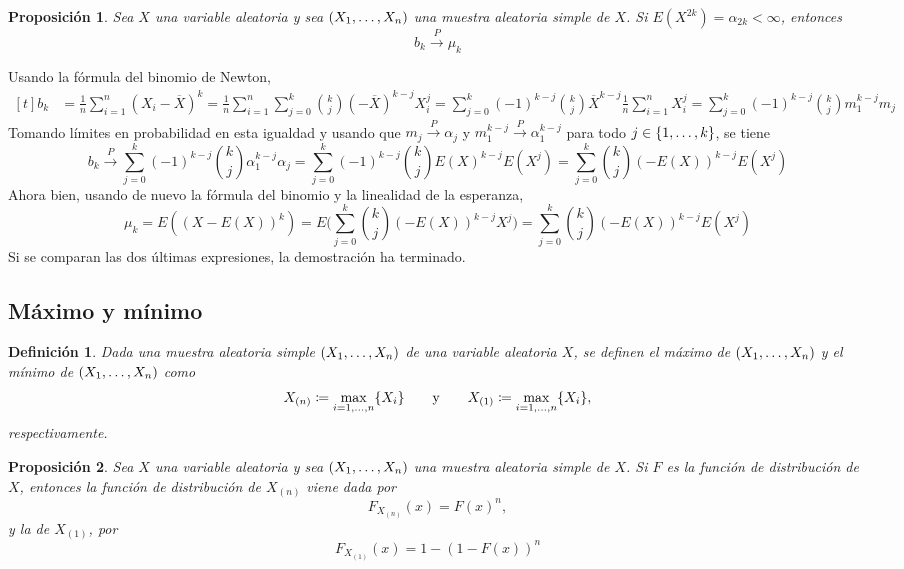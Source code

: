 \documentclass[11pt]{report}
\makeatletter
\renewenvironment{proof}[1][\proofname]{\par
  \pushQED{\qed}%
  \normalfont \topsep\z@skip %
  \trivlist
  \item[\hskip\labelsep
        \itshape
    #1\@addpunct{.}]\ignorespaces
}{%
  \popQED\endtrivlist\@endpefalse
}
\newtheorem{proposition}{Proposición}
\newtheorem{definition}{Definición}
\theoremstyle{definition}
\makeatother
\begin{document}
\begin{proposition}
Sea $X$ una variable aleatoria y sea $(X_1,\mathellipsis,X_n)$ una muestra aleatoria simple de $X$. Si $E(X^{2k}) = \alpha_{2k} < \infty$, entonces \[b_k \xrightarrow{P} \mu_k\]
\end{proposition}

\begin{proof}
Usando la fórmula del binomio de Newton,
\[
\begin{aligned}[t]
b_k &= \frac{1}{n}\sum_{i=1}^n(X_i-\overline{X})^k = \frac{1}{n}\sum_{i=1}^n\sum_{j=0}^k\binom{k}{j}(-\overline{X})^{k-j}X_i^j = \sum_{j=0}^k(-1)^{k-j} \binom{k}{j} \overline{X}^{k-j} \frac{1}{n}\sum_{i=1}^n X_i^j = \sum_{j=0}^k (-1)^{k-j}\binom{k}{j} m_1^{k-j} m_j
\end{aligned}
\]
Tomando límites en probabilidad en esta igualdad y usando que $m_j \xrightarrow{P}\alpha_j$ y $m_1^{k-j} \xrightarrow{P} \alpha_1^{k-j}$ para todo $j \in \{1,\mathellipsis,k\}$, se tiene
\[b_k \xrightarrow{P} \sum_{j=0}^k (-1)^{k-j} \binom{k}{j} \alpha_1^{k-j}\alpha_j = \sum_{j=0}^k (-1)^{k-j} \binom{k}{j} E(X)^{k-j}E(X^j) = \sum_{j=0}^k \binom{k}{j} (-E(X))^{k-j}E(X^j)\]
Ahora bien, usando de nuevo la fórmula del binomio y la linealidad de la esperanza,
\[\mu_k = E((X-E(X))^k) = E\biggl(\sum_{j=0}^k \binom{k}{j}(-E(X))^{k-j}X^j\biggr) = \sum_{j=0}^k \binom{k}{j}(-E(X))^{k-j}E(X^j) \]
Si se comparan las dos últimas expresiones, la demostración ha terminado.
\end{proof}

\subsection{Máximo y mínimo}

\begin{definition}
Dada una muestra aleatoria simple $(X_1,\mathellipsis,X_n)$ de una variable aleatoria $X$, se definen el \emph{máximo de $(X_1,\mathellipsis,X_n)$} y el \emph{mínimo de $(X_1,\mathellipsis,X_n)$} como
\[X_{(n)} \coloneqq \max_{i=1,\mathellipsis,n} \{X_i\} \qquad \textup{y} \qquad X_{(1)} \coloneqq \max_{i=1,\mathellipsis,n} \{X_i\},\]
respectivamente.
\end{definition}

\begin{proposition}
Sea $X$ una variable aleatoria y sea $(X_1,\mathellipsis,X_n)$ una muestra aleatoria simple de $X$. Si $F$ es la función de distribución de $X$, entonces la función de distribución de $X_{(n)}$ viene dada por
\[F_{X_{(n)}}(x)=F(x)^n,\]
y la de $X_{(1)}$, por
\[F_{X_{(1)}}(x)= 1-(1-F(x))^n\]
\end{proposition}
\end{document}
